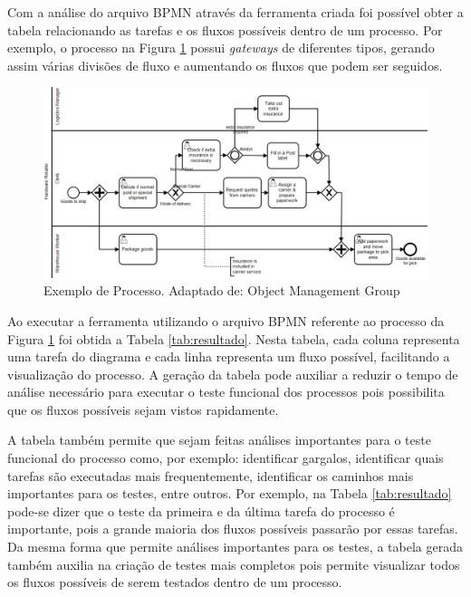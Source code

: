 \documentclass[12pt]{article}
\begin{document}
Com a análise do arquivo BPMN através da ferramenta criada foi possível obter a tabela relacionando as tarefas e os fluxos possíveis dentro de um processo. Por exemplo, o processo na Figura \ref{fig:diagrama_exemplo} possui \emph{gateways} de diferentes tipos, gerando assim várias divisões de fluxo e aumentando os fluxos que podem ser seguidos. 

\begin{figure}[ht]
\includegraphics[width=1.0\textwidth]{figuras/diagrama_exemplo.png}
\caption{Exemplo de Processo. Adaptado de: Object Management Group}
\label{fig:diagrama_exemplo}
\end{figure}

Ao executar a ferramenta utilizando o arquivo BPMN referente ao processo da Figura \ref{fig:diagrama_exemplo} foi obtida a Tabela \ref{tab:resultado}. Nesta tabela, cada coluna representa uma tarefa do diagrama e cada linha representa um fluxo possível, facilitando a visualização do processo. A geração da tabela pode auxiliar a reduzir o tempo de análise necessário para executar o teste funcional dos processos pois possibilita que os fluxos possíveis sejam vistos rapidamente. 

A tabela também permite que sejam feitas análises importantes para o teste funcional do processo como, por exemplo: identificar gargalos, identificar quais tarefas são executadas mais frequentemente, identificar os caminhos mais importantes para os testes, entre outros. Por exemplo, na Tabela \ref{tab:resultado} pode-se dizer que o teste da primeira e da última tarefa do processo é importante, pois a grande maioria dos fluxos possíveis passarão por essas tarefas. Da mesma forma que permite análises importantes para os testes, a tabela gerada também auxilia na criação de testes mais completos pois permite visualizar todos os fluxos possíveis de serem testados dentro de um processo.
\end{document}
